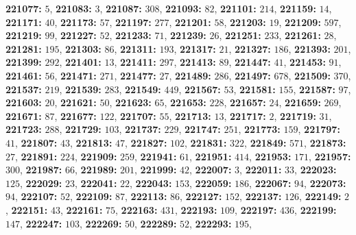\textsf{\bfseries 221077:} $5$, \textsf{\bfseries 221083:} $3$, \textsf{\bfseries 221087:} $308$, \textsf{\bfseries 221093:} $82$, \textsf{\bfseries 221101:} $214$, \textsf{\bfseries 221159:} $14$, \textsf{\bfseries 221171:} $40$, \textsf{\bfseries 221173:} $57$, \textsf{\bfseries 221197:} $277$, \textsf{\bfseries 221201:} $58$, \textsf{\bfseries 221203:} $19$, \textsf{\bfseries 221209:} $597$, \textsf{\bfseries 221219:} $99$, \textsf{\bfseries 221227:} $52$, \textsf{\bfseries 221233:} $71$, \textsf{\bfseries 221239:} $26$, \textsf{\bfseries 221251:} $233$, \textsf{\bfseries 221261:} $28$, \textsf{\bfseries 221281:} $195$, \textsf{\bfseries 221303:} $86$, \textsf{\bfseries 221311:} $193$, \textsf{\bfseries 221317:} $21$, \textsf{\bfseries 221327:} $186$, \textsf{\bfseries 221393:} $201$, \textsf{\bfseries 221399:} $292$, \textsf{\bfseries 221401:} $13$, \textsf{\bfseries 221411:} $297$, \textsf{\bfseries 221413:} $89$, \textsf{\bfseries 221447:} $41$, \textsf{\bfseries 221453:} $91$, \textsf{\bfseries 221461:} $56$, \textsf{\bfseries 221471:} $271$, \textsf{\bfseries 221477:} $27$, \textsf{\bfseries 221489:} $286$, \textsf{\bfseries 221497:} $678$, \textsf{\bfseries 221509:} $370$, \textsf{\bfseries 221537:} $219$, \textsf{\bfseries 221539:} $283$, \textsf{\bfseries 221549:} $449$, \textsf{\bfseries 221567:} $53$, \textsf{\bfseries 221581:} $155$, \textsf{\bfseries 221587:} $97$, \textsf{\bfseries 221603:} $20$, \textsf{\bfseries 221621:} $50$, \textsf{\bfseries 221623:} $65$, \textsf{\bfseries 221653:} $228$, \textsf{\bfseries 221657:} $24$, \textsf{\bfseries 221659:} $269$, \textsf{\bfseries 221671:} $87$, \textsf{\bfseries 221677:} $122$, \textsf{\bfseries 221707:} $55$, \textsf{\bfseries 221713:} $13$, \textsf{\bfseries 221717:} $2$, \textsf{\bfseries 221719:} $31$, \textsf{\bfseries 221723:} $288$, \textsf{\bfseries 221729:} $103$, \textsf{\bfseries 221737:} $229$, \textsf{\bfseries 221747:} $251$, \textsf{\bfseries 221773:} $159$, \textsf{\bfseries 221797:} $41$, \textsf{\bfseries 221807:} $43$, \textsf{\bfseries 221813:} $47$, \textsf{\bfseries 221827:} $102$, \textsf{\bfseries 221831:} $322$, \textsf{\bfseries 221849:} $571$, \textsf{\bfseries 221873:} $27$, \textsf{\bfseries 221891:} $224$, \textsf{\bfseries 221909:} $259$, \textsf{\bfseries 221941:} $61$, \textsf{\bfseries 221951:} $414$, \textsf{\bfseries 221953:} $171$, \textsf{\bfseries 221957:} $300$, \textsf{\bfseries 221987:} $66$, \textsf{\bfseries 221989:} $201$, \textsf{\bfseries 221999:} $42$, \textsf{\bfseries 222007:} $3$, \textsf{\bfseries 222011:} $33$, \textsf{\bfseries 222023:} $125$, \textsf{\bfseries 222029:} $23$, \textsf{\bfseries 222041:} $22$, \textsf{\bfseries 222043:} $153$, \textsf{\bfseries 222059:} $186$, \textsf{\bfseries 222067:} $94$, \textsf{\bfseries 222073:} $94$, \textsf{\bfseries 222107:} $52$, \textsf{\bfseries 222109:} $87$, \textsf{\bfseries 222113:} $86$, \textsf{\bfseries 222127:} $152$, \textsf{\bfseries 222137:} $126$, \textsf{\bfseries 222149:} $2$, \textsf{\bfseries 222151:} $43$, \textsf{\bfseries 222161:} $75$, \textsf{\bfseries 222163:} $431$, \textsf{\bfseries 222193:} $109$, \textsf{\bfseries 222197:} $436$, \textsf{\bfseries 222199:} $147$, \textsf{\bfseries 222247:} $103$, \textsf{\bfseries 222269:} $50$, \textsf{\bfseries 222289:} $52$, \textsf{\bfseries 222293:} $195$, 
